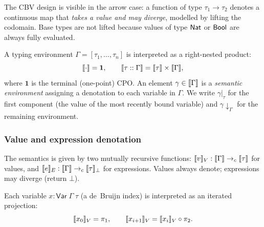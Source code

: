 The CBV design is visible in the arrow case: a function of type
$\tau_1 \to \tau_2$ denotes a continuous map that \emph{takes a value and
may diverge}, modelled by lifting the codomain.  Base types are not
lifted because values of type $\mathsf{Nat}$ or $\mathsf{Bool}$ are always fully
evaluated.

\begin{definition}
\label{def:env-interpretation}
A typing environment $\Gamma = [\tau_1, \ldots, \tau_n]$ is interpreted as
a right-nested product:
\[
  \llbracket \cdot \rrbracket = \mathbf{1}, \qquad
  \llbracket \tau :: \Gamma \rrbracket = \llbracket \tau \rrbracket \times \llbracket \Gamma \rrbracket,
\]
where $\mathbf{1}$ is the terminal (one-point) CPO.  An element $\gamma
\in \llbracket \Gamma \rrbracket$ is a \emph{semantic environment} assigning a denotation
to each variable in $\Gamma$.  We write $\gamma|_\tau$ for the first
component (the value of the most recently bound variable) and
$\gamma \!\downarrow_\Gamma$ for the remaining environment.
\end{definition}

\subsubsection*{Value and expression denotation}

The semantics is given by two mutually recursive functions: $\llbracket v \rrbracket_V :
\llbracket \Gamma \rrbracket \to_c \llbracket \tau \rrbracket$ for values, and $\llbracket e \rrbracket_E : \llbracket \Gamma \rrbracket
\to_c \llbracket \tau \rrbracket_\bot$ for expressions.  Values always denote; expressions
may diverge (return $\bot$).

\begin{definition}
\label{def:sem-var}
Each variable $x : \mathsf{Var}\;\Gamma\;\tau$ (a de~Bruijn index) is
interpreted as an iterated projection:
\[
  \llbracket x_0 \rrbracket_V = \pi_1, \qquad
  \llbracket x_{i+1} \rrbracket_V = \llbracket x_i \rrbracket_V \circ \pi_2.
\]
\end{definition}


